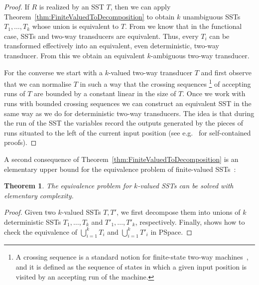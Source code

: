 \documentclass{article}
\newtheorem{theorem}{Theorem}\newtheorem{lemma}[theorem]{Lemma}\newtheorem{proposition}[theorem]{Proposition}\newtheorem{corollary}[theorem]{Corollary}\newtheorem{definition}[theorem]{Definition}\newtheorem{claim}[theorem]{Claim}\newtheorem{remark}[theorem]{Remark}\newtheorem{example}[theorem]{Example}\newtheorem*{claim*}{Claim}
\begin{document}
\begin{proof} 
 If $R$ is realized by an SST $T$, then we can apply
  Theorem~\ref{thm:FiniteValuedToDecomposition} to obtain $k$
  unambiguous SSTs $T_1,\dots,T_k$ whose union is equivalent
  to $T$.
  From \cite{DBLP:conf/fsttcs/AlurC10} we know that in the functional
  case, SSTs and two-way transducers are equivalent.
  Thus, every $T_i$ can be transformed effectively into an equivalent,
  even deterministic,  two-way transducer.
  From this we obtain an equivalent $k$-ambiguous two-way transducer.

  For the converse we start with a $k$-valued two-way transducer $T$ and
  first observe that we can normalise $T$ in such a way that the
  crossing sequences%
\footnote{A crossing sequence is a standard notion
    for finite-state two-way machines~\cite{DBLP:journals/ibmrd/Shepherdson59},
    and it is defined as the sequence of
    states in which a given input position 
    is visited by an accepting run of the machine.}
  of accepting runs of $T$ are bounded by a
  constant linear in the size of $T$.
  Once we work with runs with bounded crossing sequences we can
  construct an equivalent SST in the same way as we do for
  deterministic two-way transducers.
  The idea is that during the run of the SST 
  the variables record the outputs
  generated by the pieces of runs situated to the left 
  of the current input position 
  (see e.g.~\cite{ledent13,DBLP:journals/ijfcs/DartoisJR18} for self-contained proofs). 
\end{proof}


A second consequence of Theorem~\ref{thm:FiniteValuedToDecomposition}
is an elementary upper bound for the 
equivalence problem of finite-valued
SSTs~\cite{equivalence-finite-valued}:

\begin{theorem}\label{thm:equiv-finval-SST}
  The equivalence problem for $k$-valued SSTs can be solved with
  elementary complexity.
\end{theorem}

\begin{proof}
  Given two $k$-valued SSTs $T,T'$, we first decompose them into
  unions of $k$
  deterministic SSTs $T_1,\dots,T_k$ and $T'_1,\dots,T'_k$,
  respectively.
  Finally, \cite[Theorem 4.4]{DBLP:conf/icalp/AlurD11} shows how to check the
  equivalence of $\bigcup_{i=1}^k T_i$ and $\bigcup_{i=1}^k
      T'_i$  in {\upshape\sc PSpace}.
\end{proof}
\end{document}
